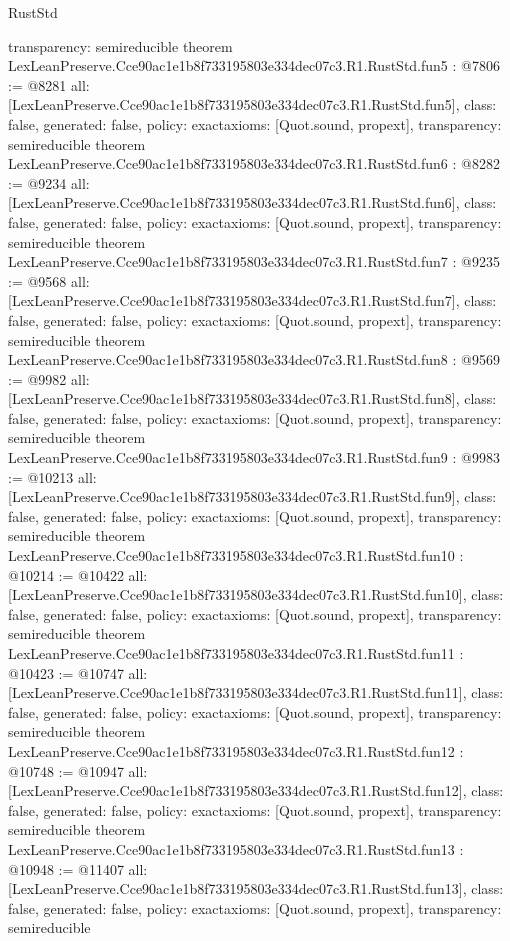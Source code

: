 \begin{lexlean}{RustStd}
\begin{coremodule}
{  transparency: semireducible
}
theorem LexLeanPreserve.Cce90ac1e1b8f733195803e334dec07c3.R1.RustStd.fun5 : @7806 := @8281 {
  all: [LexLeanPreserve.Cce90ac1e1b8f733195803e334dec07c3.R1.RustStd.fun5],
  class: false,
  generated: false,
  policy: exact{axioms: [Quot.sound, propext]},
  transparency: semireducible
}
theorem LexLeanPreserve.Cce90ac1e1b8f733195803e334dec07c3.R1.RustStd.fun6 : @8282 := @9234 {
  all: [LexLeanPreserve.Cce90ac1e1b8f733195803e334dec07c3.R1.RustStd.fun6],
  class: false,
  generated: false,
  policy: exact{axioms: [Quot.sound, propext]},
  transparency: semireducible
}
theorem LexLeanPreserve.Cce90ac1e1b8f733195803e334dec07c3.R1.RustStd.fun7 : @9235 := @9568 {
  all: [LexLeanPreserve.Cce90ac1e1b8f733195803e334dec07c3.R1.RustStd.fun7],
  class: false,
  generated: false,
  policy: exact{axioms: [Quot.sound, propext]},
  transparency: semireducible
}
theorem LexLeanPreserve.Cce90ac1e1b8f733195803e334dec07c3.R1.RustStd.fun8 : @9569 := @9982 {
  all: [LexLeanPreserve.Cce90ac1e1b8f733195803e334dec07c3.R1.RustStd.fun8],
  class: false,
  generated: false,
  policy: exact{axioms: [Quot.sound, propext]},
  transparency: semireducible
}
theorem LexLeanPreserve.Cce90ac1e1b8f733195803e334dec07c3.R1.RustStd.fun9 : @9983 := @10213 {
  all: [LexLeanPreserve.Cce90ac1e1b8f733195803e334dec07c3.R1.RustStd.fun9],
  class: false,
  generated: false,
  policy: exact{axioms: [Quot.sound, propext]},
  transparency: semireducible
}
theorem LexLeanPreserve.Cce90ac1e1b8f733195803e334dec07c3.R1.RustStd.fun10 : @10214 := @10422 {
  all: [LexLeanPreserve.Cce90ac1e1b8f733195803e334dec07c3.R1.RustStd.fun10],
  class: false,
  generated: false,
  policy: exact{axioms: [Quot.sound, propext]},
  transparency: semireducible
}
theorem LexLeanPreserve.Cce90ac1e1b8f733195803e334dec07c3.R1.RustStd.fun11 : @10423 := @10747 {
  all: [LexLeanPreserve.Cce90ac1e1b8f733195803e334dec07c3.R1.RustStd.fun11],
  class: false,
  generated: false,
  policy: exact{axioms: [Quot.sound, propext]},
  transparency: semireducible
}
theorem LexLeanPreserve.Cce90ac1e1b8f733195803e334dec07c3.R1.RustStd.fun12 : @10748 := @10947 {
  all: [LexLeanPreserve.Cce90ac1e1b8f733195803e334dec07c3.R1.RustStd.fun12],
  class: false,
  generated: false,
  policy: exact{axioms: [Quot.sound, propext]},
  transparency: semireducible
}
theorem LexLeanPreserve.Cce90ac1e1b8f733195803e334dec07c3.R1.RustStd.fun13 : @10948 := @11407 {
  all: [LexLeanPreserve.Cce90ac1e1b8f733195803e334dec07c3.R1.RustStd.fun13],
  class: false,
  generated: false,
  policy: exact{axioms: [Quot.sound, propext]},
  transparency: semireducible
}
\end{coremodule}
\end{lexlean}

